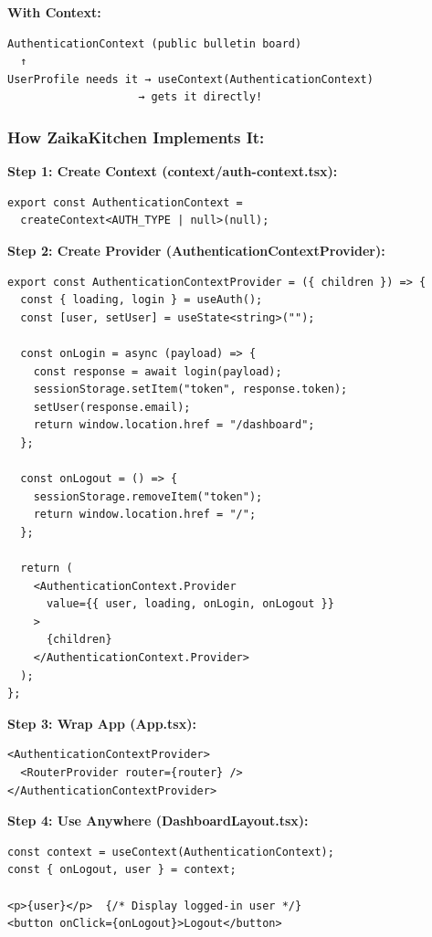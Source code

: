 \documentclass[12pt]{article}
\begin{document}
\textbf{With Context:}
\begin{lstlisting}
AuthenticationContext (public bulletin board)
  ↑ 
UserProfile needs it → useContext(AuthenticationContext) 
                    → gets it directly!
\end{lstlisting}

\subsubsection*{How ZaikaKitchen Implements It:}

\textbf{Step 1: Create Context (context/auth-context.tsx):}

\begin{lstlisting}
export const AuthenticationContext = 
  createContext<AUTH_TYPE | null>(null);
\end{lstlisting}

\textbf{Step 2: Create Provider (AuthenticationContextProvider):}

\begin{lstlisting}
export const AuthenticationContextProvider = ({ children }) => {
  const { loading, login } = useAuth();
  const [user, setUser] = useState<string>("");
  
  const onLogin = async (payload) => {
    const response = await login(payload);
    sessionStorage.setItem("token", response.token);
    setUser(response.email);
    return window.location.href = "/dashboard";
  };
  
  const onLogout = () => {
    sessionStorage.removeItem("token");
    return window.location.href = "/";
  };
  
  return (
    <AuthenticationContext.Provider 
      value={{ user, loading, onLogin, onLogout }}
    >
      {children}
    </AuthenticationContext.Provider>
  );
};
\end{lstlisting}

\textbf{Step 3: Wrap App (App.tsx):}

\begin{lstlisting}
<AuthenticationContextProvider>
  <RouterProvider router={router} />
</AuthenticationContextProvider>
\end{lstlisting}

\textbf{Step 4: Use Anywhere (DashboardLayout.tsx):}

\begin{lstlisting}
const context = useContext(AuthenticationContext);
const { onLogout, user } = context;

<p>{user}</p>  {/* Display logged-in user */}
<button onClick={onLogout}>Logout</button>
\end{lstlisting}
\end{document}
